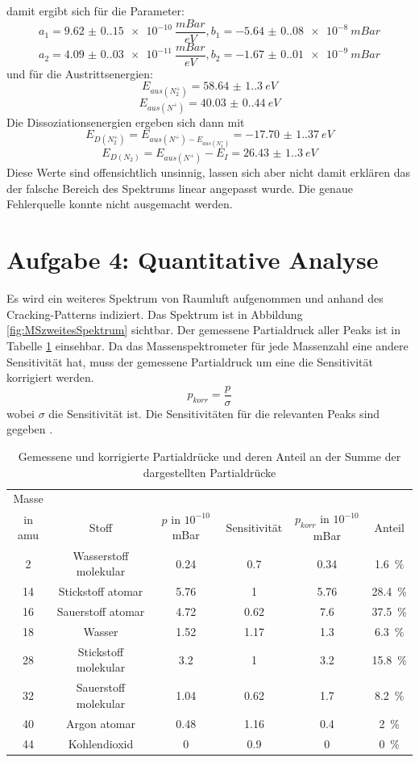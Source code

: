 damit ergibt sich für die Parameter: 
$$a_1 = \SI{ 9.62(0.15)e-10}{\frac{mBar}{eV}}, b_1 = \SI{-5.64(0.08)e-8}{mBar}$$
$$a_2 = \SI{4.09(0.03)e-11}{\frac{mBar}{eV}}, b_2 = \SI{-1.67(0.01)e-9}{mBar}$$
und für die Austrittsenergien: 
$$E_{aus(N_2^+)}= \SI{58.64(1.30)}{eV}$$
$$E_{aus(N^{+})}= \SI{40.03(0.44)}{eV}$$
Die Dissoziationsenergien ergeben sich dann mit
$$E_{D(N_2^+)} = E_{aus(N^+)-E_{aus(N_2^+)}} = \SI{-17.70(1.37)}{eV}$$
$$E_{D(N_2)} = E_{aus(N^+)} - E_I = \SI{26.43(1.30)}{eV}$$
Diese Werte sind offensichtlich unsinnig, lassen sich aber nicht damit erklären das der falsche Bereich des Spektrums linear angepasst wurde. Die genaue Fehlerquelle konnte nicht ausgemacht werden. 

\section{Aufgabe 4: Quantitative Analyse}
Es wird ein weiteres Spektrum von Raumluft aufgenommen und anhand des Cracking-Patterns\cite{VorbereitungsMappe} indiziert. 
Das Spektrum ist in Abbildung \ref{fig:MSzweitesSpektrum} sichtbar. 
Der gemessene Partialdruck aller Peaks ist in Tabelle \ref{tab:MSQuantTable} einsehbar. Da das Massenspektrometer für jede Massenzahl eine andere Sensitivität hat, muss der gemessene Partialdruck um eine die Sensitivität korrigiert werden.
$$p_{korr} = \frac{p}{\sigma}$$
wobei $\sigma$ die Sensitivität ist. 
Die Sensitivitäten für die relevanten Peaks sind gegeben \cite{VorbereitungsMappe}.   

\begin{table}[H]
    \centering
    \caption{Gemessene und korrigierte Partialdrücke und deren Anteil an der Summe der dargestellten Partialdrücke}
    \begin{tabular}{cc|cccc}
        Masse \\in amu & Stoff & $p$ in $10^{-10}$ mBar& Sensitivität& $p_{korr}$ in $10^{-10}$ mBar &Anteil \\\hline
        2& Wasserstoff molekular & 0.24&0.7&0.34&\SI{1.6}{\%}\\
        14& Stickstoff atomar &5.76&1&5.76&\SI{28.4}{\%}\\
        16& Sauerstoff atomar &4.72&0.62&7.6&\SI{37.5}{\%}\\
        18& Wasser &1.52&1.17&1.3&\SI{6.3}{\%}\\
        28& Stickstoff molekular&3.2&1&3.2&\SI{15.8}{\%}\\
        32& Sauerstoff molekular&1.04&0.62&1.7&\SI{8.2}{\%}\\
        40& Argon atomar&0.48&1.16&0.4&\SI{2}{\%}\\
        44& Kohlendioxid&0&0.9&0&\SI{0}{\%}\\\hline
    \end{tabular}
    
    \label{tab:MSQuantTable}
\end{table}

